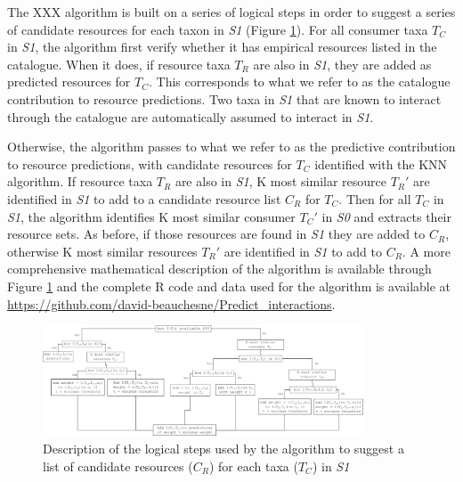 \documentclass[letterpaper]{article}
\begin{document}
The XXX algorithm is built on a series of logical steps in order to suggest a series of candidate resources for each taxon in \textit{S1} (Figure \ref{fig:decision_diag}). For all consumer taxa $T_C$ in \textit{S1}, the algorithm first verify whether it has empirical resources listed in the catalogue. When it does, if resource taxa $T_R$ are also in \textit{S1}, they are added as predicted resources for $T_C$. This corresponds to what we refer to as the catalogue contribution to resource predictions. Two taxa in \textit{S1} that are known to interact through the catalogue are automatically assumed to interact in \textit{S1}.

Otherwise, the algorithm passes to what we refer to as the predictive contribution to resource predictions, with candidate resources for $T_C$ identified with the KNN algorithm. If resource taxa $T_R$ are also in \textit{S1}, K most similar resource $T_R'$ are identified in \textit{S1} to add to a candidate resource list $C_R$ for $T_C$. Then for all $T_C$ in \textit{S1}, the algorithm identifies K most similar consumer $T_C'$ in \textit{S0} and extracts their resource sets. As before, if those resources are found in \textit{S1} they are added to $C_R$, otherwise K most similar resources $T_R'$ are identified in \textit{S1} to add to $C_R$. A more comprehensive mathematical description of the algorithm is available through Figure \ref{fig:decision_diag} and the complete R code and data used for the algorithm is available at \href{https://github.com/david-beauchesne/Predict_interactions}{https://github.com/david-beauchesne/Predict\_interactions}.

        \begin{figure}[h]
          \centering\includegraphics[width=0.85\textwidth]{Decision_Diagram.png}
          \caption{Description of the logical steps used by the algorithm to suggest a list of candidate resources ($C_R$) for each taxa ($T_C$) in \textit{S1}}
          \label{fig:decision_diag}
        \end{figure}
\end{document}
